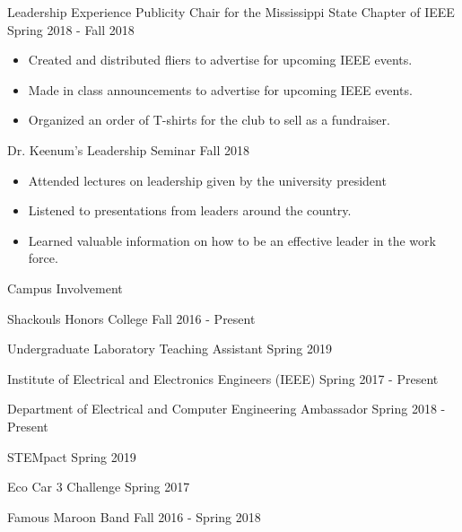 \documentclass{resume} %
\begin{document}
\begin{rSection}{Leadership Experience}
Publicity Chair for the Mississippi State Chapter of IEEE \hfill Spring 2018 - Fall 2018
\begin{itemize}
    \item Created and distributed fliers to advertise for upcoming IEEE events. 
    \item Made in class announcements to advertise for upcoming IEEE events. 
    \item Organized an order of T-shirts for the club to sell as a fundraiser. \\
\end{itemize}

Dr. Keenum's Leadership Seminar \hfill Fall 2018
\begin{itemize}
    \item Attended lectures on leadership given by the university president
    \item Listened to presentations from leaders around the country. 
    \item Learned valuable information on how to be an effective leader in the work force. 
\end{itemize}

\end{rSection}

\begin{rSection}{Campus Involvement} \itemsep -3pt
\item Shackouls Honors College  \hfill Fall 2016 - Present
\item Undergraduate Laboratory Teaching Assistant \hfill Spring 2019
\item Institute of Electrical and Electronics Engineers (IEEE) \hfill Spring 2017 - Present
\item Department of Electrical and Computer Engineering Ambassador  \hfill Spring 2018 - Present
\item STEMpact  \hfill Spring 2019
\item Eco Car 3 Challenge  \hfill Spring 2017
\item Famous Maroon Band \hfill Fall 2016 - Spring 2018

\end{rSection}

\end{document}
